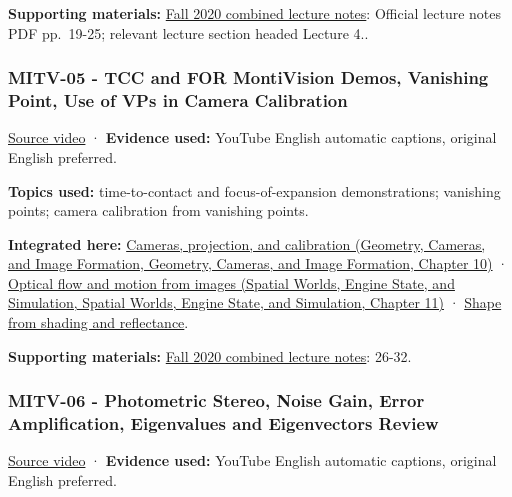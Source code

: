 \textbf{Supporting materials:} \href{https://ocw.mit.edu/courses/6-801-machine-vision-fall-2020/9ec44f69e72995c370b3797818ba01e6_MIT6_801F20_lectureNotes.pdf}{Fall 2020 combined lecture notes}: Official lecture notes PDF pp.~19-25; relevant lecture section headed Lecture 4..

\subsubsection{MITV-05 - TCC and FOR MontiVision Demos, Vanishing Point, Use of VPs in Camera Calibration}\label{04-visual-computing-ii-ch036-mitv-05---tcc-and-for-montivision-demos-vanishing-point-use-of-vps-in-camera-calibration}

\href{https://www.youtube.com/watch?v=SSlPV1iYjHw}{Source video} · \textbf{Evidence used:} YouTube English automatic captions, original English preferred.

\textbf{Topics used:} time-to-contact and focus-of-expansion demonstrations; vanishing points; camera calibration from vanishing points.

\textbf{Integrated here:} \href{../03-Geometry-Cameras-and-Image-Formation/main.pdf\#nameddest=03-visual-computing-i-ch003-cameras-projection-and-calibration}{Cameras, projection, and calibration (Geometry, Cameras, and Image Formation, Geometry, Cameras, and Image Formation, Chapter 10)} · \href{../05-Spatial-Worlds-Engine-State-and-Simulation/main.pdf\#nameddest=04-visual-computing-ii-ch030-optical-flow-and-motion-from-images}{Optical flow and motion from images (Spatial Worlds, Engine State, and Simulation, Spatial Worlds, Engine State, and Simulation, Chapter 11)} · \hyperref[04-visual-computing-ii-ch032-shape-from-shading-and-reflectance]{Shape from shading and reflectance}.

\textbf{Supporting materials:} \href{https://ocw.mit.edu/courses/6-801-machine-vision-fall-2020/9ec44f69e72995c370b3797818ba01e6_MIT6_801F20_lectureNotes.pdf}{Fall 2020 combined lecture notes}: 26-32.

\subsubsection{MITV-06 - Photometric Stereo, Noise Gain, Error Amplification, Eigenvalues and Eigenvectors Review}\label{04-visual-computing-ii-ch036-mitv-06---photometric-stereo-noise-gain-error-amplification-eigenvalues-and-eigenvectors-review}

\href{https://www.youtube.com/watch?v=OOrT17RsVxE}{Source video} · \textbf{Evidence used:} YouTube English automatic captions, original English preferred.

